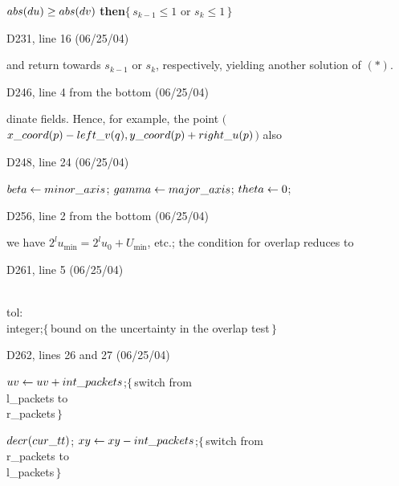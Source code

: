 {{\ninepoint\noindent
{} $\\{abs}(\\{du})\ge\\{abs}(\\{dv})$ {\bf then}\quad $\{\,
 s_{k-1}\le1$ or $s_k\le1\,\}$

\bugonpage D231, line 16 (06/25/04)

\noindent
and return towards $s_{k-1}$ or $s_k$,
respectively, yielding another solution of $(*)$.

\bugonpage D246, line 4 from the bottom (06/25/04)

\noindent
dinate fields. Hence, for example,
the point $\bigl($$\\{x\_coord}(p)-\\{left\_v}(q),\\{y\_coord}(p)+%
\\{right\_u}(p)$$\bigr)$
also\cutpar

\bugonpage D248, line 24 (06/25/04)

\ninepoint\noindent
{} $\\{beta}\gets\\{minor\_axis}$;
 $\\{gamma}\gets\\{major\_axis}$;
 $\\{theta}\gets0$;

\bugonpage D256, line 2 from the bottom (06/25/04)

\noindent
we have $2^lu_{\min}=2^lu_0+U_{\min}$, etc.; the condition for overlap
reduces to

\bugonpage D261, line 5 (06/25/04)

\ninepoint\noindent
\\{tol}: \\{integer};\quad$\{\,$bound on the uncertainty in the overlap test$\,\}$

\bugonpage D262, lines 26 and 27 (06/25/04)

\ninepoint\noindent
\qquad\quad$\\{uv}\gets\\{uv}+\\{int\_packets}$;\quad$\{\,$switch
   from \\{l\_packets} to \\{r\_packets}$\,\}$\par\noindent
\qquad\quad$\\{decr}(\\{cur\_tt})$;
 $\\{xy}\gets\\{xy}-\\{int\_packets}$;\quad$\{\,$switch
   from \\{r\_packets} to \\{l\_packets}$\,\}$

}}
